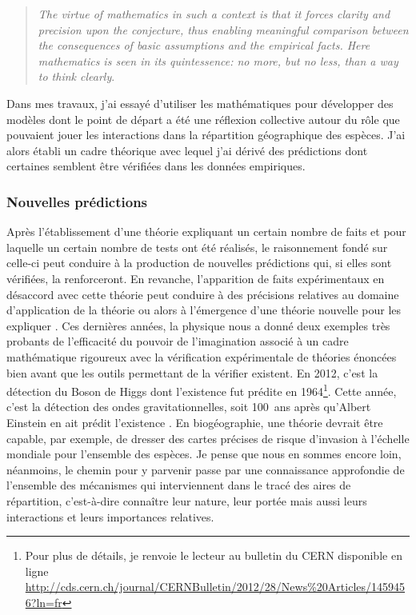 \begin{quote}
\emph{The virtue of mathematics in such a context is that it forces
clarity and precision upon the conjecture, thus enabling meaningful
comparison between the consequences of basic assumptions and the
empirical facts. Here mathematics is seen in its quintessence: no more,
but no less, than a way to think clearly}.
\end{quote}

Dans mes travaux, j'ai essayé d'utiliser les mathématiques pour
développer des modèles dont le point de départ a été une réflexion
collective autour du rôle que pouvaient jouer les interactions dans la
répartition géographique des espèces. J'ai alors établi un cadre
théorique avec lequel j'ai dérivé des prédictions dont certaines
semblent être vérifiées dans les données empiriques.

\subsubsection*{Nouvelles prédictions}\label{nouvelles-pruxe9dictions}

Après l'établissement d'une théorie expliquant un certain nombre de
faits et pour laquelle un certain nombre de tests ont été réalisés, le
raisonnement fondé sur celle-ci peut conduire à la production de
nouvelles prédictions qui, si elles sont vérifiées, la renforceront. En
revanche, l'apparition de faits expérimentaux en désaccord avec cette
théorie peut conduire à des précisions relatives au domaine
d'application de la théorie ou alors à l'émergence d'une théorie
nouvelle pour les expliquer \citep{Popper1959}. Ces dernières années, la
physique nous a donné deux exemples très probants de l'efficacité du
pouvoir de l'imagination associé à un cadre mathématique rigoureux avec
la vérification expérimentale de théories énoncées bien avant que les
outils permettant de la vérifier existent. En 2012, c'est la détection
du Boson de Higgs dont l'existence fut prédite en 1964\footnote{Pour
  plus de détails, je renvoie le lecteur au bulletin du CERN disponible
  en ligne
  \url{http://cds.cern.ch/journal/CERNBulletin/2012/28/News\%20Articles/1459456?ln=fr}}.
Cette année, c'est la détection des ondes gravitationnelles, soit
100~ans après qu'Albert Einstein en ait prédit l'existence
\citep{Waldrop2016}. En biogéographie, une théorie devrait être capable,
par exemple, de dresser des cartes précises de risque d'invasion à
l'échelle mondiale pour l'ensemble des espèces. Je pense que nous en
sommes encore loin, néanmoins, le chemin pour y parvenir passe par une
connaissance approfondie de l'ensemble des mécanismes qui interviennent
dans le tracé des aires de répartition, c'est-à-dire connaître leur
nature, leur portée mais aussi leurs interactions et leurs importances
relatives.

